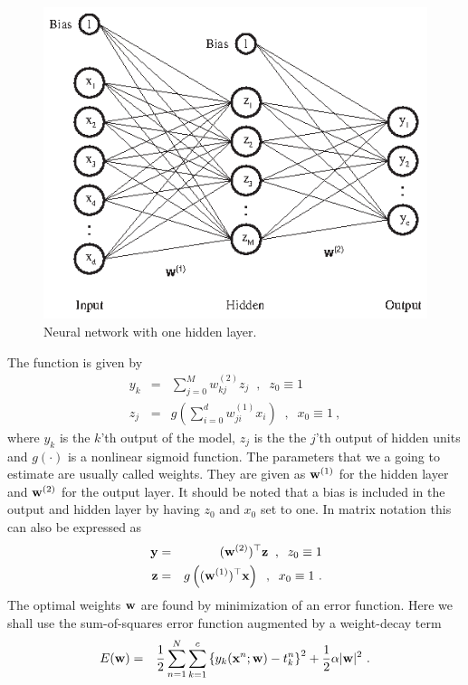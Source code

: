\documentclass[12pt]{article}
\def\z{{\bf z}}
\def\y{{\bf y}}
\def\x{{\bf x}}
\def\w{{\bf w}}
\begin{document}
\begin{figure}[hb]
\center
\includegraphics[width=16cm]{NN.eps}
\caption{Neural network with one hidden layer.}
\label{NN.eps}
\end{figure}
The function is  given by
%
\begin{eqnarray} \label{eq:model}
  y_{k} &=& \sum_{j=0}^M w^{(2)}_{kj} z_j \;\; , \;\;z_0\equiv1\\
   z_j &=& g\left(\sum_{i=0}^d w^{(1)}_{ji} x_i \right) \;\; , \;\;x_0\equiv1 \ ,
\end{eqnarray}
%
where $y_k$ is the $k$'th output of the model, $z_j$ is the the $j$'th output of hidden units and $g(\cdot)$ is a nonlinear
sigmoid
function. The parameters that we a going to estimate are usually called weights. They are given as
$\w^{(1)}$ for the hidden layer and $\w^{(2)}$ for the output layer.
It should be noted that a bias is included in the output and hidden layer by having $z_0$ and $x_0$ set to
one.
In matrix notation this can also be expressed as
\begin{eqnarray}
  \label{eq:model}
  \y &=& (\w^{(2)})^\top \z \;\; , \;\;z_0\equiv1\\\
   \z &=& g\left((\w^{(1)})^\top \x \right) \;\; , \;\;x_0\equiv1 \ .
\end{eqnarray}
%
The optimal weights $\w$  are found by minimization of an error function.
Here we shall use the sum-of-squares error function augmented by a
weight-decay term
\begin{eqnarray}
  \label{eq:error1}
  E(\w) &=& \frac{1}{2} \sum_{n=1}^N \sum_{k=1}^{c}\left\{ y_k(\x^n;\w)-t_k^n \right\}^2 + \frac{1}{2}\alpha|\w|^2 \ .
\end{eqnarray}
\end{document}
